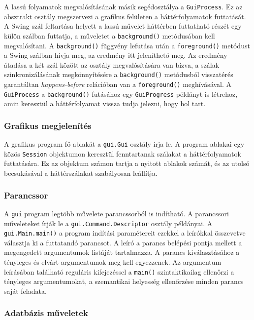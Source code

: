 A lassú folyamatok megvalósításának másik segédosztálya a \texttt{GuiProcess}.
Ez az absztrakt osztály megszervezi a grafikus felületen a háttérfolyamatok futtatását.
A Swing szál feltartása helyett a lassú művelet háttérben futtatható részét egy külön szálban futtatja, a műveletet a \texttt{background()} metódusában kell megvalósítani.
A \texttt{background()} függvény lefutása után a \texttt{foreground()} metódust a Swing szálban hívja meg, az eredmény itt jeleníthető meg.
Az eredmény átadása a két szál között az osztály megvalósítására van bízva, a szálak szinkronizálásának megkönnyítésére a \texttt{background()} metódusból visszatérés garantáltan \textit{happens-before} relációban van a \texttt{foreground()} meghívásával.
A \texttt{GuiProcess} a \texttt{background()} futásához egy \texttt{GuiProgress} példányt is létrehoz, amin keresztül a háttérfolyamat vissza tudja jelezni, hogy hol tart.

\subsubsection{Grafikus megjelenítés}

A grafikus program fő ablakát a \texttt{gui.Gui} osztály írja le.
A program ablakai egy közös \texttt{Session} objektumon keresztül fenntartanak szálakat a háttérfolyamatok futtatására.
Ez az objektum számon tartja a nyitott ablakok számát, és az utolsó becsukásával a háttérszálakat szabályosan leállítja.

\subsubsection{Parancssor}

A \texttt{gui} program legtöbb művelete parancssorból is indítható.
A parancssori műveleteket írják le a \texttt{gui.Command.Descriptor} osztály példányai. A \texttt{gui.Main.main()} a program indítási paramétereit ezekkel a leírókkal összevetve választja ki a futtatandó parancsot.
A leíró a parancs belépési pontja mellett a megengedett argumentumok listáját tartalmazza.
A parancs kiválasztásához a tényleges és elvárt argumentumok meg kell egyezzenek.
Az argumentum leírásában található reguláris kifejezéssel a \texttt{main()} szintaktikailag ellenőrzi a tényleges argumentumokat, a szemantikai helyesség ellenőrzése minden parancs saját feladata.

\subsubsection{Adatbázis műveletek}

